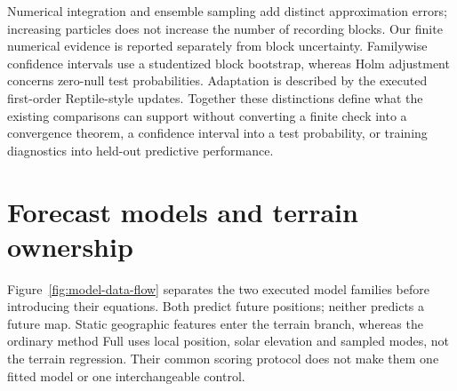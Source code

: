 Numerical integration and ensemble sampling add distinct approximation
errors\cite{kloeden1992}; increasing particles does not increase the number
of recording blocks. Our finite numerical evidence is reported separately
from block uncertainty. Familywise confidence intervals use a studentized
block bootstrap\cite{davison1997}, whereas Holm adjustment concerns
zero-null test probabilities\cite{holm1979}. Adaptation is described by the
executed first-order Reptile-style updates\cite{nichol2018}.
Together these distinctions define what the existing comparisons can
support without converting a finite check into a convergence theorem,
a confidence interval into a test probability, or training diagnostics
into held-out predictive performance.


\section{Forecast models and terrain ownership}
\label{sec:models}\hypertarget{sec:models}{}
Figure~\ref{fig:model-data-flow} separates the two executed model families
before introducing their equations. Both predict future positions; neither
predicts a future map. Static geographic features enter the terrain branch,
whereas the ordinary method Full uses local position, solar elevation and
sampled modes, not the terrain regression. Their common scoring protocol
does not make them one fitted model or one interchangeable control.
